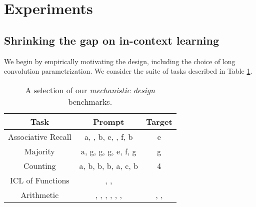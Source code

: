 \section{Experiments}\label{experiments}
\subsection{Shrinking the gap on in-context learning}\label{eval_ker}
We begin by empirically motivating the  design, including the choice of long convolution parametrization. We consider the suite of tasks described in Table \ref{table:grok}.
\begin{table}[b]
    \small
    \centering
    \caption{A selection of our \textit{mechanistic design} benchmarks.}
    \setlength{\tabcolsep}{5.8pt}
    \label{table:grok}
    \begin{tabular}{@{}c|cc@{}}
    \toprule
    \textbf{Task} &\multicolumn{1}{c}{\textbf{Prompt}}&\multicolumn{1}{c}{\textbf{Target}}\\
    \midrule 
    Associative Recall & a, , b, e, , f, b & e\\  
    Majority & a, g, g, g, e, f, g & g \\
    Counting & a, b, b, b, a, c, b & 4\\
    ICL of Functions & , ,  &  \\ 
    Arithmetic & , , , , , ,  & , ,  \\
    \bottomrule
    \end{tabular}
\end{table}
